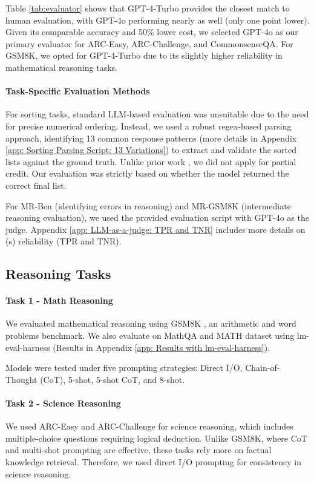 Table \ref{tab:evaluator} shows that GPT-4-Turbo provides the closest match to human evaluation, with GPT-4o performing nearly as well (only one point lower). Given its comparable accuracy and 50\% lower cost, we selected GPT-4o as our primary evaluator for ARC-Easy, ARC-Challenge, and CommonsenseQA. For GSM8K, we opted for GPT-4-Turbo due to its slightly higher reliability in mathematical reasoning tasks.

\paragraph{Task-Specific Evaluation Methods} For sorting tasks, standard LLM-based evaluation was unsuitable due to the need for precise numerical ordering. Instead, we used a robust regex-based parsing approach, identifying 13 common response patterns (more details in Appendix \ref{app: Sorting Parsing Script: 13 Variations}) to extract and validate the sorted lists against the ground truth. Unlike prior work \cite{Besta_2024}, we did not apply for partial credit. Our evaluation was strictly based on whether the model returned the correct final list.

For MR-Ben (identifying errors in reasoning) and MR-GSM8K (intermediate reasoning evaluation), we used the provided evaluation script with GPT-4o as the judge. Appendix \ref{app: LLM-as-a-judge: TPR and TNR} includes more details on (s) reliability (TPR and TNR).


\subsection{Reasoning Tasks}
\label{main: Reasoning Tasks}

\paragraph{Task 1 - Math Reasoning} We evaluated mathematical reasoning using GSM8K \cite{cobbe2021trainingverifierssolvemath}, an arithmetic and word problems benchmark. We also evaluate on MathQA \cite{amini2019mathqa} and MATH \cite{hendrycksmath2021} dataset using lm-eval-harness (Results in Appendix \ref{app: Results with lm-eval-harness}).

Models were tested under five prompting strategies: Direct I/O, Chain-of-Thought (CoT), 5-shot, 5-shot CoT, and 8-shot. 

\paragraph{Task 2 - Science Reasoning} We used ARC-Easy and ARC-Challenge \cite{clark2018thinksolvedquestionanswering} for science reasoning, which includes multiple-choice questions requiring logical deduction. Unlike GSM8K, where CoT and multi-shot prompting are effective, these tasks rely more on factual knowledge retrieval. Therefore, we used direct I/O prompting for consistency in science reasoning.

